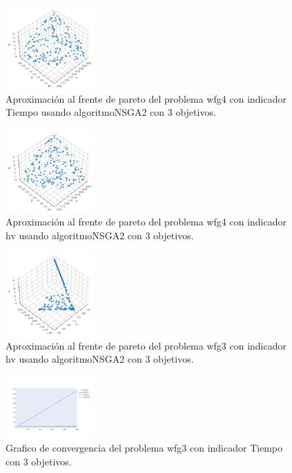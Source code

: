 \documentclass{article}
\begin{document}
\clearpage
\begin{figure}
	\includegraphics[width=0.3\textwidth]{NSGA2_wfg4_Tiempo_3_fp.png}
	\caption{Aproximación al frente de pareto del problema wfg4 con indicador Tiempo usando algoritmoNSGA2 con 3 objetivos.}
\end{figure}
\begin{figure}
	\includegraphics[width=0.3\textwidth]{NSGA2_wfg4_hv_3_fp.png}
	\caption{Aproximación al frente de pareto del problema wfg4 con indicador hv usando algoritmoNSGA2 con 3 objetivos.}
\end{figure}
\begin{figure}
	\includegraphics[width=0.3\textwidth]{NSGA2_wfg3_hv_3_fp.png}
	\caption{Aproximación al frente de pareto del problema wfg3 con indicador hv usando algoritmoNSGA2 con 3 objetivos.}
\end{figure}
\clearpage
\begin{figure}
	\includegraphics[width=0.3\textwidth]{wfg3_Tiempo_3_gc.png}
	\caption{Grafico de convergencia del problema wfg3 con indicador Tiempo con 3 objetivos.}
\end{figure}
\end{document}
